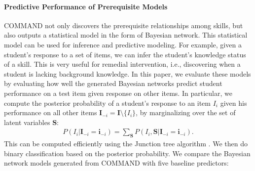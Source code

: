 \documentclass{edm_template}
\begin{document}
	\paragraph{Predictive Performance of Prerequisite Models}
	\label{sec:predictive_performance}
	COMMAND not only discovers the prerequisite relationships among skills, but also outputs a statistical model in the form of Bayesian network.
	This statistical model can be used for inference and predictive modeling.
	For example, given a student's response to a set of items, we can infer the student's knowledge status of a skill.
	This is very useful for remedial intervention, i.e., discovering when a student is lacking background knowledge. 
	In this paper, we evaluate these models by evaluating how well the generated Bayesian networks predict student performance
	on a test item given response on other items.
	In particular, we compute the posterior probability of a student's response to an item $I_i$ given his performance on all other items 
	$\mathbf{I}_{-i}=\mathbf{I}\setminus\{I_i\}$, by marginalizing over the set of latent variables $\mathbf{S}$:
	\begin{align}
		P(I_i|\mathbf{I}_{-i}=\mathbf{i}_{-i}) =\sum_{\mathbf{S}}P(I_i, \mathbf{S}|\mathbf{I}_{-i}=\mathbf{i}_{-i}).
	\end{align}
	This can be computed efficiently using the Junction tree algorithm \cite{koller2009probabilistic}. 
	We then do binary classification based on the posterior probability.
	We compare the Bayesian network models generated from COMMAND with five baseline predictors:
\end{document}
